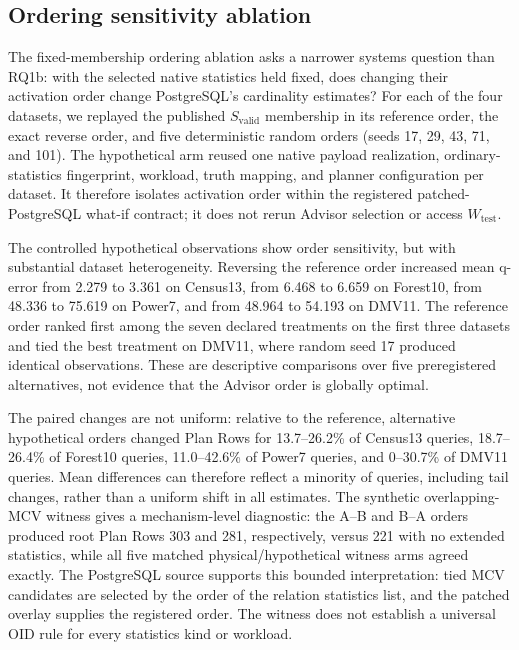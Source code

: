 \subsection{Ordering sensitivity ablation}
The fixed-membership ordering ablation asks a narrower systems question than
RQ1b: with the selected native statistics held fixed, does changing their
activation order change PostgreSQL's cardinality estimates? For each of the
four datasets, we replayed the published $S_{\mathrm{valid}}$ membership in
its reference order, the exact reverse order, and five deterministic random
orders (seeds 17, 29, 43, 71, and 101). The hypothetical arm reused one
native payload realization, ordinary-statistics fingerprint, workload, truth
mapping, and planner configuration per dataset. It therefore isolates
activation order within the registered patched-PostgreSQL what-if contract;
it does not rerun Advisor selection or access $W_{\mathrm{test}}$.



The controlled hypothetical observations show order sensitivity, but with
substantial dataset heterogeneity. Reversing the reference order increased
mean q-error from 2.279 to 3.361 on Census13, from 6.468 to 6.659 on
Forest10, from 48.336 to 75.619 on Power7, and from 48.964 to 54.193 on
DMV11. The reference order ranked first among the seven declared treatments
on the first three datasets and tied the best treatment on DMV11, where
random seed 17 produced identical observations. These are descriptive
comparisons over five preregistered alternatives, not evidence that the
Advisor order is globally optimal.

The paired changes are not uniform: relative to the reference, alternative
hypothetical orders changed Plan Rows for 13.7--26.2\% of Census13 queries,
18.7--26.4\% of Forest10 queries, 11.0--42.6\% of Power7 queries, and
0--30.7\% of DMV11 queries. Mean differences can therefore reflect a
minority of queries, including tail changes, rather than a uniform shift in
all estimates. The synthetic overlapping-MCV witness gives a mechanism-level
diagnostic: the A--B and B--A orders produced root Plan Rows 303 and 281,
respectively, versus 221 with no extended statistics, while all five matched
physical/hypothetical witness arms agreed exactly. The PostgreSQL source
supports this bounded interpretation: tied MCV candidates are selected by
the order of the relation statistics list, and the patched overlay supplies
the registered order. The witness does not establish a universal OID rule
for every statistics kind or workload.

